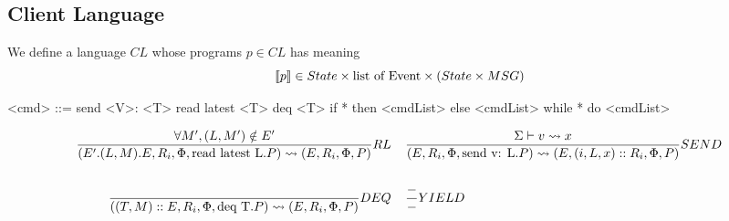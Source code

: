 \documentclass[acmsmall,review,anonymous]{acmart}\settopmatter{printfolios=true}
\begin{document}
\subsection{Client Language}

We define a language $CL$ whose programs $p\in CL$ has meaning \[\semfunc[p] \in State \times \text{list of Event} \times (State \times MSG)\]

\begin{grammar}
	<cmd> ::= send <V>: <T>
         \alt read latest <T>
         \alt deq <T>
         \alt if * then <cmdList> else <cmdList>
         \alt while * do <cmdList>
\end{grammar}

\begin{align*}
\judge{RL}{
	\forall M', (L, M') \notin E'
}{
	(E'.(L, M).E, R_i, \Phi, \text{read latest L}.P) \reduce (E, R_i, \Phi, P)
}& \;\;\;\;
\judge{SEND}{
	\Sigma \vdash v \reduce x
}{
	(E, R_i, \Phi, \text{send v: L}.P)\reduce (E, (i, L, x)::R_i, \Phi, P)
}\\
\\
\judge{DEQ}{
	\;
}{
	((T, M)::E, R_i, \Phi, \text{deq T}.P) \reduce (E, R_i, \Phi, P)
} & \;\;\;\;
\judge{YIELD}{
	 -
}{
	-
}
\end{align*}





% 
% 






\newpage





\newpage

\appendix

% 

%
\end{document}
